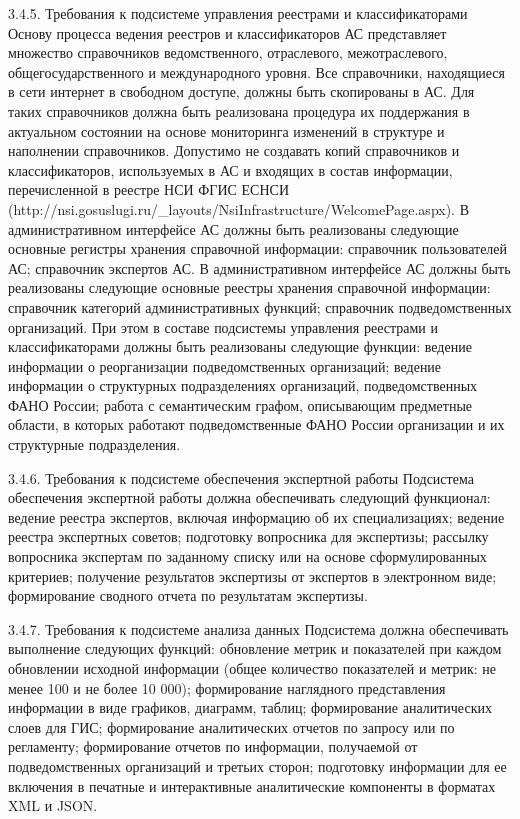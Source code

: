 3.4.5. Требования к подсистеме управления реестрами и классификаторами
Основу процесса ведения реестров и классификаторов АС представляет множество справочников ведомственного, отраслевого, межотраслевого, общегосударственного и международного уровня.
Все справочники, находящиеся в сети интернет в свободном доступе, должны быть скопированы в АС.
Для таких справочников должна быть реализована процедура их поддержания в актуальном состоянии на основе мониторинга изменений в структуре и наполнении справочников.
Допустимо не создавать копий справочников и классификаторов, используемых в АС и входящих в состав информации, перечисленной в реестре НСИ ФГИС ЕСНСИ (http://nsi.gosuslugi.ru/_layouts/NsiInfrastructure/WelcomePage.aspx).
В административном интерфейсе АС должны быть реализованы следующие основные регистры хранения справочной информации: 
справочник пользователей АС; 
справочник экспертов АС.
В административном интерфейсе АС  должны быть реализованы следующие основные реестры хранения справочной информации: 
справочник категорий административных функций;
справочник подведомственных организаций.
При этом в составе подсистемы управления реестрами и классификаторами должны быть реализованы следующие функции:
ведение информации о реорганизации подведомственных организаций;
ведение информации о структурных подразделениях организаций, подведомственных ФАНО России;
работа с семантическим графом, описывающим предметные области, в которых работают подведомственные ФАНО России организации и их структурные подразделения. 

3.4.6. Требования к подсистеме обеспечения экспертной работы
Подсистема обеспечения экспертной работы должна обеспечивать следующий функционал: 
ведение реестра экспертов, включая информацию об их специализациях;
ведение реестра экспертных советов;
подготовку вопросника для экспертизы;
рассылку вопросника экспертам по заданному списку или на основе сформулированных критериев;
получение результатов экспертизы от экспертов в электронном виде;
формирование сводного отчета по результатам экспертизы. 

3.4.7. Требования к подсистеме анализа данных
Подсистема должна обеспечивать выполнение следующих функций:
обновление метрик и показателей при каждом обновлении исходной информации (общее количество показателей и метрик:  не менее 100 и не более 10 000);
формирование наглядного представления информации в виде графиков, диаграмм, таблиц;
формирование аналитических слоев для ГИС;
формирование аналитических отчетов по запросу или по регламенту;
формирование отчетов по информации, получаемой от подведомственных организаций и третьих сторон;
подготовку информации для ее включения в печатные и интерактивные аналитические компоненты в форматах XML и JSON.

